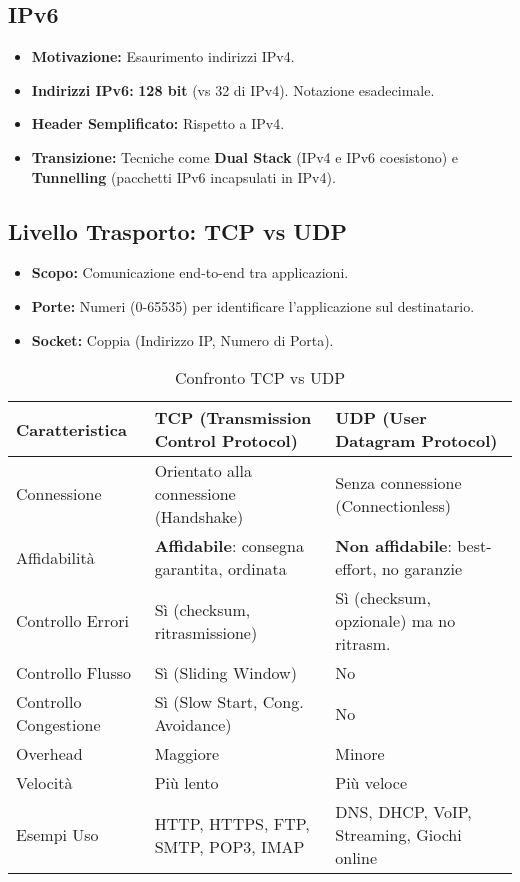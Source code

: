 \subsection{IPv6}
\begin{itemize}
    \item \textbf{Motivazione:} Esaurimento indirizzi IPv4.
    \item \textbf{Indirizzi IPv6:} \textbf{128 bit} (vs 32 di IPv4). Notazione esadecimale.
    \item \textbf{Header Semplificato:} Rispetto a IPv4.
    \item \textbf{Transizione:} Tecniche come \textbf{Dual Stack} (IPv4 e IPv6 coesistono) e \textbf{Tunnelling} (pacchetti IPv6 incapsulati in IPv4).
\end{itemize}

\subsection{Livello Trasporto: TCP vs UDP}
\begin{itemize}
    \item \textbf{Scopo:} Comunicazione end-to-end tra applicazioni.
    \item \textbf{Porte:} Numeri (0-65535) per identificare l'applicazione sul destinatario.
    \item \textbf{Socket:} Coppia (Indirizzo IP, Numero di Porta).
\end{itemize}
\begin{table}[H]
    \centering
    \begin{tabular}{|l|l|l|}
        \hline
        \rowcolor{bg_custom}
        \textbf{Caratteristica} & \textbf{TCP (Transmission Control Protocol)} & \textbf{UDP (User Datagram Protocol)} \\
        \hline
        Connessione & Orientato alla connessione (Handshake) & Senza connessione (Connectionless) \\
        \hline
        Affidabilità & \textbf{Affidabile}: consegna garantita, ordinata & \textbf{Non affidabile}: best-effort, no garanzie \\
        \hline
        Controllo Errori & Sì (checksum, ritrasmissione) & Sì (checksum, opzionale) ma no ritrasm. \\
        \hline
        Controllo Flusso & Sì (Sliding Window) & No \\
        \hline
        Controllo Congestione & Sì (Slow Start, Cong. Avoidance) & No \\
        \hline
        Overhead & Maggiore & Minore \\
        \hline
        Velocità & Più lento & Più veloce \\
        \hline
        Esempi Uso & HTTP, HTTPS, FTP, SMTP, POP3, IMAP & DNS, DHCP, VoIP, Streaming, Giochi online \\
        \hline
    \end{tabular}
    \caption{Confronto TCP vs UDP}
\end{table}

